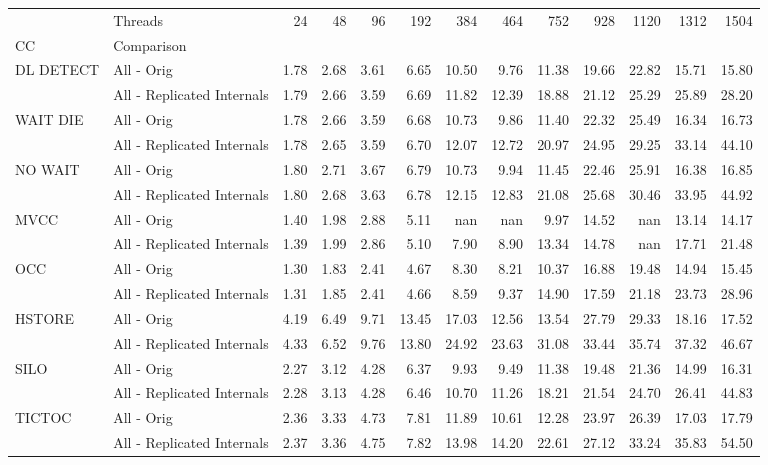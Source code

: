 \begin{tabular}{llrrrrrrrrrrr}
\toprule
       & Threads &  24   &  48   &  96   &  192  &  384  &  464  &  752  &  928  &  1120 &  1312 &  1504 \\
CC & Comparison &       &       &       &       &       &       &       &       &       &       &       \\
\midrule
DL DETECT & All - Orig &  1.78 &  2.68 &  3.61 &  6.65 & 10.50 &  9.76 & 11.38 & 19.66 & 22.82 & 15.71 & 15.80 \\
       & All - Replicated Internals &  1.79 &  2.66 &  3.59 &  6.69 & 11.82 & 12.39 & 18.88 & 21.12 & 25.29 & 25.89 & 28.20 \\
WAIT DIE & All - Orig &  1.78 &  2.66 &  3.59 &  6.68 & 10.73 &  9.86 & 11.40 & 22.32 & 25.49 & 16.34 & 16.73 \\
       & All - Replicated Internals &  1.78 &  2.65 &  3.59 &  6.70 & 12.07 & 12.72 & 20.97 & 24.95 & 29.25 & 33.14 & 44.10 \\
NO WAIT & All - Orig &  1.80 &  2.71 &  3.67 &  6.79 & 10.73 &  9.94 & 11.45 & 22.46 & 25.91 & 16.38 & 16.85 \\
       & All - Replicated Internals &  1.80 &  2.68 &  3.63 &  6.78 & 12.15 & 12.83 & 21.08 & 25.68 & 30.46 & 33.95 & 44.92 \\
MVCC & All - Orig &  1.40 &  1.98 &  2.88 &  5.11 &   nan &   nan &  9.97 & 14.52 &   nan & 13.14 & 14.17 \\
       & All - Replicated Internals &  1.39 &  1.99 &  2.86 &  5.10 &  7.90 &  8.90 & 13.34 & 14.78 &   nan & 17.71 & 21.48 \\
OCC & All - Orig &  1.30 &  1.83 &  2.41 &  4.67 &  8.30 &  8.21 & 10.37 & 16.88 & 19.48 & 14.94 & 15.45 \\
       & All - Replicated Internals &  1.31 &  1.85 &  2.41 &  4.66 &  8.59 &  9.37 & 14.90 & 17.59 & 21.18 & 23.73 & 28.96 \\
HSTORE & All - Orig &  4.19 &  6.49 &  9.71 & 13.45 & 17.03 & 12.56 & 13.54 & 27.79 & 29.33 & 18.16 & 17.52 \\
       & All - Replicated Internals &  4.33 &  6.52 &  9.76 & 13.80 & 24.92 & 23.63 & 31.08 & 33.44 & 35.74 & 37.32 & 46.67 \\
SILO & All - Orig &  2.27 &  3.12 &  4.28 &  6.37 &  9.93 &  9.49 & 11.38 & 19.48 & 21.36 & 14.99 & 16.31 \\
       & All - Replicated Internals &  2.28 &  3.13 &  4.28 &  6.46 & 10.70 & 11.26 & 18.21 & 21.54 & 24.70 & 26.41 & 44.83 \\
TICTOC & All - Orig &  2.36 &  3.33 &  4.73 &  7.81 & 11.89 & 10.61 & 12.28 & 23.97 & 26.39 & 17.03 & 17.79 \\
       & All - Replicated Internals &  2.37 &  3.36 &  4.75 &  7.82 & 13.98 & 14.20 & 22.61 & 27.12 & 33.24 & 35.83 & 54.50 \\
\bottomrule
\end{tabular}
